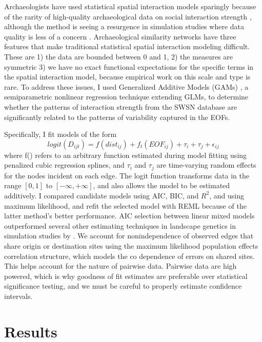 \documentclass[10pt]{iopart}
\begin{document}
Archaeologists have used statistical spatial interaction models sparingly \parencite{Tobler1971,Hodder1974,Johnson1990ChumashAnalysis} because of the rarity of high-quality archaeological data on social interaction strength \parencite{plogg?}, although the method is seeing a resurgence in simulation studies where data quality is less of a concern \parencite{Bevan2013, Evans2011, Davies2014}. Archaeological similarity networks have three features that make traditional statistical spatial interaction modeling difficult. These are 1) the data are bounded between 0 and 1, 2) the measures are symmetric 3) we have no exact functional expectations for the specific terms in the spatial interaction model, because empirical work on this scale and type is rare. To address these issues, I used Generalized Additive Models (GAMs) \parencite{Wood2006a}, a semiparametric nonlinear regression technique extending GLMs, to determine whether the patterns of interaction strength from the SWSN database are significantly related to the patterns of variability captured in the EOFs. 

Specifically, I fit models of the form
\begin{equation}
    logit\left(D_{ijt}\right) = f(dist_{ij}) + f_t(EOF_{ij}) + \tau_i + \tau_j + \epsilon_{ij}
\end{equation}
where f() refers to an arbitrary function estimated during model fitting using penalized cubic regression splines, and $\tau_i$ and $\tau_j$ are time-varying random effects for the nodes incident on each edge. The logit function transforms data in the range $[0, 1]$ to $[-\infty, +\infty]$, and also allows the model to be estimated additively. I compared candidate models using AIC, BIC, and $R^2$, and using maximum likelihood, and refit the selected model with REML because of the latter method's better performance. AIC selection between linear mixed models outperformed several other estimating techniques in landscape genetics in simulation studies by \parencite{Shirk et al 2018}. We account for nonindependence of observed edges that share origin or destination sites using the maximum likelihood population effects correlation structure, which models the co dependence of errors on shared sites. This helps account for the nature of pairwise data. Pairwise data are high powered, which is why goodness of fit estimates are preferable over statistical significance testing, and we must be careful to properly estimate confidence intervals. 

\section*{Results}
\end{document}
